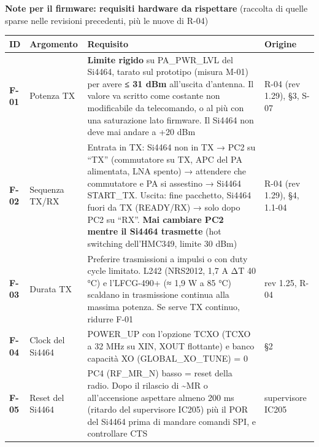 \begin{notebox}
\textbf{Note per il firmware: requisiti hardware da rispettare} (raccolta di quelle sparse nelle revisioni precedenti, più le nuove di R-04)

\begin{center}{\footnotesize{}\setlength{\tabcolsep}{4pt}\renewcommand{\arraystretch}{1.1}
\begin{tabular}{>{\raggedright\arraybackslash}p{}>{\raggedright\arraybackslash}p{}>{\raggedright\arraybackslash}p{}>{\raggedright\arraybackslash}p{}}
\toprule
\textbf{ID} & \textbf{Argomento} & \textbf{Requisito} & \textbf{Origine} \\
\midrule
\textbf{F-01} & Potenza TX & \textbf{Limite rigido} su PA\_\allowbreak{}PWR\_\allowbreak{}LVL del Si4464, tarato sul prototipo (misura M-01) per avere \textbf{≤ 31 dBm} all'uscita d'antenna. Il valore va scritto come costante non modificabile da telecomando, o al più con una saturazione lato firmware. Il Si4464 non deve mai andare a +20 dBm & R-04 (rev 1.29), §3, S-07 \\\midrule[0.15pt]
\textbf{F-02} & Sequenza TX/\allowbreak{}RX & Entrata in TX: Si4464 non in TX → PC2 su \textquotedblleft{}TX\textquotedblright{} (commutatore su TX, APC del PA alimentata, LNA spento) → attendere che commutatore e PA si assestino → Si4464 START\_\allowbreak{}TX. Uscita: fine pacchetto, Si4464 fuori da TX (READY/\allowbreak{}RX) → solo dopo PC2 su \textquotedblleft{}RX\textquotedblright{}. \textbf{Mai cambiare PC2 mentre il Si4464 trasmette} (hot switching dell'HMC349, limite 30 dBm) & R-04 (rev 1.29), §4, 1.1-04 \\\midrule[0.15pt]
\textbf{F-03} & Durata TX & Preferire trasmissioni a impulsi o con duty cycle limitato. L242 (NRS2012, 1,7 A ΔT 40 °C) e l'LFCG-490+ (≈ 1,9 W a 85 °C) scaldano in trasmissione continua alla massima potenza. Se serve TX continuo, ridurre F-01 & rev 1.25, R-04 \\\midrule[0.15pt]
\textbf{F-04} & Clock del Si4464 & POWER\_\allowbreak{}UP con l'opzione TCXO (TCXO a 32 MHz su XIN, XOUT flottante) e banco capacità XO (GLOBAL\_\allowbreak{}XO\_\allowbreak{}TUNE) = 0 & §2 \\\midrule[0.15pt]
\textbf{F-05} & Reset del Si4464 & PC4 (RF\_\allowbreak{}MR\_\allowbreak{}N) basso = reset della radio. Dopo il rilascio di \textasciitilde{}MR o all'accensione aspettare almeno 200 ms (ritardo del supervisore IC205) più il POR del Si4464 prima di mandare comandi SPI, e controllare CTS & supervisore IC205 \\\midrule[0.15pt]

\end{tabular}}
\end{center}
\end{notebox}

